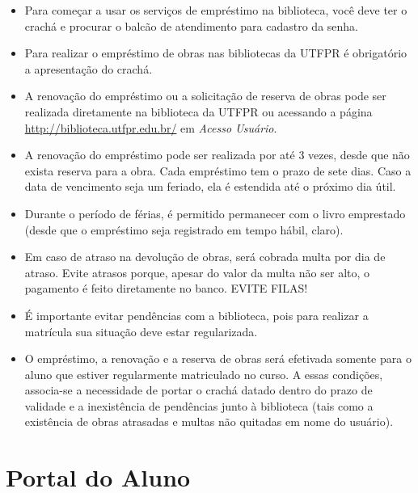 \documentclass[a4paper,12pt,openany]{article}
\begin{document}
\begin{itemize}

\item Para começar a usar os serviços de empréstimo na biblioteca, você deve ter o crachá e procurar o balcão de atendimento para cadastro da senha.

\item Para realizar o empréstimo de obras nas bibliotecas da UTFPR é obrigatório a apresentação do crachá.

\item A renovação do empréstimo ou a solicitação de reserva de obras pode ser realizada diretamente na biblioteca da UTFPR ou acessando a página \url{http://biblioteca.utfpr.edu.br/} em \textit{Acesso Usuário}.

\item A renovação do empréstimo pode ser realizada por até 3 vezes, desde que não exista reserva para a obra. Cada empréstimo tem o prazo de sete dias. Caso a data de vencimento seja um feriado, ela é estendida até o próximo dia útil.

\item Durante o período de férias, é permitido permanecer com o livro emprestado (desde que o empréstimo seja registrado em tempo hábil, claro).

\item Em caso de atraso na devolução de obras, será cobrada multa por dia de atraso. Evite atrasos porque, apesar do valor da multa não ser alto, o pagamento é feito diretamente no banco. EVITE FILAS!

\item É importante evitar pendências com a biblioteca, pois para realizar a matrícula sua situação deve estar regularizada.

\item O empréstimo, a renovação e a reserva de obras será efetivada somente para o aluno que estiver regularmente matriculado no curso. A essas  condições, associa-se a necessidade de portar o crachá datado dentro do prazo de validade e a inexistência de pendências junto à biblioteca (tais como a existência de obras atrasadas e multas não quitadas em nome do usuário).

\end{itemize}


\newpage
\section{Portal do Aluno} \label{sec:portal}
\end{document}
